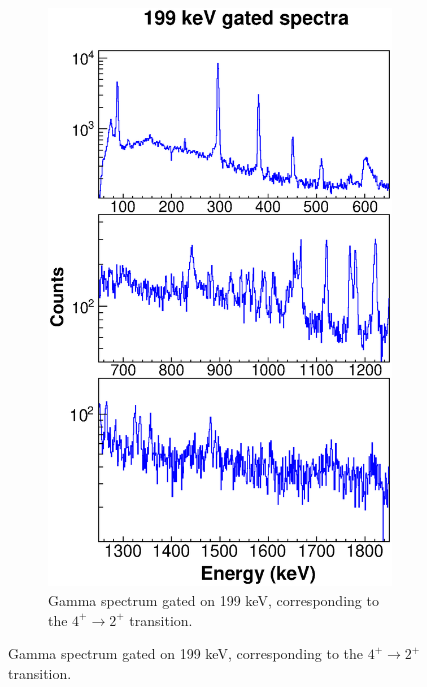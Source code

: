     \begin{figure}
    \ContinuedFloat
    \begin{subfigure}{\textwidth}
    \includegraphics[scale=0.8]{156GdTablesAndFigs/199_gamma.eps}
    \caption{Gamma spectrum gated on 199 keV, corresponding to the $4^+\rightarrow2^+$ transition.}
    \label{fig:156_4to2spec}
    \end{subfigure}
    \end{figure}